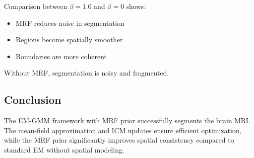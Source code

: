 \documentclass[11pt]{article}
\begin{document}
Comparison between $\beta = 1.0$ and $\beta = 0$ shows:

\begin{itemize}
\item MRF reduces noise in segmentation
\item Regions become spatially smoother
\item Boundaries are more coherent
\end{itemize}

Without MRF, segmentation is noisy and fragmented.


\subsection{Conclusion}

The EM-GMM framework with MRF prior successfully segments the brain MRI. The mean-field approximation and ICM updates ensure efficient optimization, while the MRF prior significantly improves spatial consistency compared to standard EM without spatial modeling.
\end{document}
